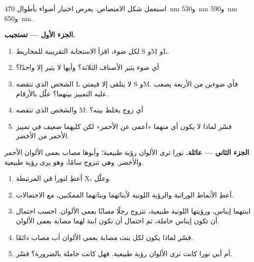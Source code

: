 \begin{problem}
\label{pb:g11:the-eye:1}
استعمل شكل الامتصاص. يعرض اختبار أضواء بأطوال \qty{470}{nm}
و\qty{530}{nm} و\qty{590}{nm} و\qty{650}{nm}.

\medskip
\noindent\textbf{الجزء الأول ---  تستجيب.}
\begin{enumerate}
  \item لكل ضوء، اقرأ الاستجابة التقريبية للمخاريط S وM وL.
  \item أي ضوء يثير الأصناف الثلاثة؟ وأيها لا يثير إلا واحدًا؟
  \item الشخص الذي تنقصه  L لا يتلقى إلا قيمتي S وM. فأي
        ضوءين من الأربعة يصعب عليه التمييز بينهما؟ علّل بالأرقام.
  \item والشخص الذي تنقصه  M: أي زوج يخلط بينه؟
  \item فسّر لماذا لا يكون أي منهما «أعمى عن الأحمر» لكن كليهما ضعيف
        في تمييز الأحمر من الأخضر.
\end{enumerate}

\medskip
\noindent\textbf{الجزء الثاني --- عائلة.}
نورا ترى الألوان رؤية طبيعية؛ وأبوها مصاب بعمى الألوان الأحمر والأخضر.
وهي تتزوج سامًا، وهو يرى رؤية طبيعية.
\begin{enumerate}[resume]
  \item أعطِ  لنورا في   المرتبطة 
        X، وعلّل.
  \item أعطِ الأنماط الوراثية والرؤية اللونية لأبنائهما وبناتهما
        الممكنين، مع الاحتمالات.
  \item ابنتهما إيناس، ورؤيتها اللونية طبيعية، تتزوج رجلًا مصابًا بعمى
        الألوان. احسب احتمال أن تكون إيناس حاملة، ثم احتمال أن تكون
        ابنة لهما مصابة بعمى الألوان.
  \item فسّر لماذا يكون لكل بنت مصابة بعمى الألوان أب مصاب دائمًا.
  \item أم أبي نورا كانت ترى الألوان رؤية طبيعية. فهل كانت حاملة
        بالضرورة؟ فسّر.
\end{enumerate}


\end{problem}
